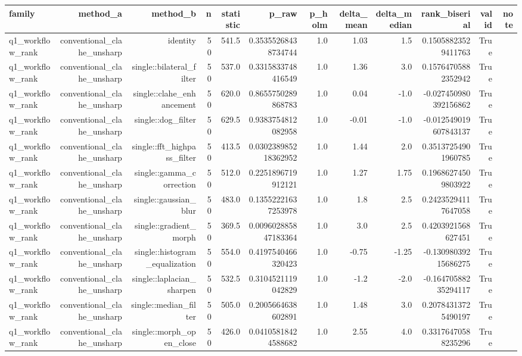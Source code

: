 \begin{tabular}{lrrrrrrrrrrr}
\hline
family & method\_a & method\_b & n & statistic & p\_raw & p\_holm & delta\_mean & delta\_median & rank\_biserial & valid & note \\
\hline
q1\_workflow\_rank & conventional\_clahe\_unsharp & identity & 50 & 541.5 & 0.35355268438734744 & 1.0 & 1.03 & 1.5 & 0.15058823529411763 & True &  \\
q1\_workflow\_rank & conventional\_clahe\_unsharp & single::bilateral\_filter & 50 & 537.0 & 0.3315833748416549 & 1.0 & 1.36 & 3.0 & 0.15764705882352942 & True &  \\
q1\_workflow\_rank & conventional\_clahe\_unsharp & single::clahe\_enhancement & 50 & 620.0 & 0.8655750289868783 & 1.0 & 0.04 & -1.0 & -0.027450980392156862 & True &  \\
q1\_workflow\_rank & conventional\_clahe\_unsharp & single::dog\_filter & 50 & 629.5 & 0.9383754812082958 & 1.0 & -0.01 & -1.0 & -0.012549019607843137 & True &  \\
q1\_workflow\_rank & conventional\_clahe\_unsharp & single::fft\_highpass\_filter & 50 & 413.5 & 0.030238985218362952 & 1.0 & 1.44 & 2.0 & 0.35137254901960785 & True &  \\
q1\_workflow\_rank & conventional\_clahe\_unsharp & single::gamma\_correction & 50 & 512.0 & 0.2251896719912121 & 1.0 & 1.27 & 1.75 & 0.19686274509803922 & True &  \\
q1\_workflow\_rank & conventional\_clahe\_unsharp & single::gaussian\_blur & 50 & 483.0 & 0.13552221637253978 & 1.0 & 1.8 & 2.5 & 0.24235294117647058 & True &  \\
q1\_workflow\_rank & conventional\_clahe\_unsharp & single::gradient\_morph & 50 & 369.5 & 0.009602885847183364 & 1.0 & 3.0 & 2.5 & 0.4203921568627451 & True &  \\
q1\_workflow\_rank & conventional\_clahe\_unsharp & single::histogram\_equalization & 50 & 554.0 & 0.4197540466320423 & 1.0 & -0.75 & -1.25 & -0.13098039215686275 & True &  \\
q1\_workflow\_rank & conventional\_clahe\_unsharp & single::laplacian\_sharpen & 50 & 532.5 & 0.3104521119042829 & 1.0 & -1.2 & -2.0 & -0.16470588235294117 & True &  \\
q1\_workflow\_rank & conventional\_clahe\_unsharp & single::median\_filter & 50 & 505.0 & 0.2005664638602891 & 1.0 & 1.48 & 3.0 & 0.20784313725490197 & True &  \\
q1\_workflow\_rank & conventional\_clahe\_unsharp & single::morph\_open\_close & 50 & 426.0 & 0.04105818424588682 & 1.0 & 2.55 & 4.0 & 0.33176470588235296 & True &  \\

\end{tabular}
